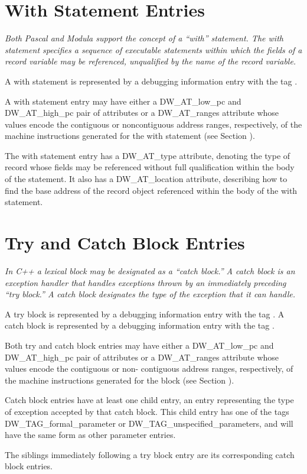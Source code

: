 \section{With Statement Entries}
\label{chap:withstatemententries}

\textit{Both Pascal and Modula support the concept of a ``with''
statement. The with statement specifies a sequence of
executable statements within which the fields of a record
variable may be referenced, unqualified by the name of the
record variable.}

A with statement is represented by a debugging information
entry with the tag .

A with statement entry may have either a DW\_AT\_low\_pc and
DW\_AT\_high\_pc pair of attributes or a DW\_AT\_ranges attribute
whose values encode the contiguous or non\dash contiguous address
ranges, respectively, of the machine instructions generated
for the with statement 
(see Section ).

The with statement entry has a DW\_AT\_type attribute, denoting
the type of record whose fields may be referenced without full
qualification within the body of the statement. It also has
a DW\_AT\_location attribute, describing how to find the base
address of the record object referenced within the body of
the with statement.

\section{Try and Catch Block Entries}
\label{chap:tryandcatchblockentries}

\textit{In C++ a lexical block may be designated as a ``catch
block.'' A catch block is an exception handler that handles
exceptions thrown by an immediately preceding ``try block.''
A catch block designates the type of the exception that it
can handle.}

A try block is represented by a debugging information entry
with the tag .  
A catch block is represented by
a debugging information entry with 
the tag .

Both try and catch block entries may have either a
DW\_AT\_low\_pc and DW\_AT\_high\_pc pair of attributes or a
DW\_AT\_ranges attribute whose values encode the contiguous
or non- contiguous address ranges, respectively, of the
machine instructions generated for the block (see Section
).

Catch block entries have at least one child entry, an
entry representing the type of exception accepted by
that catch block. This child entry has one of the tags
DW\_TAG\_formal\_parameter or DW\_TAG\_unspecified\_parameters,
and will have the same form as other parameter entries.

The siblings immediately following a try block entry are its
corresponding catch block entries.







